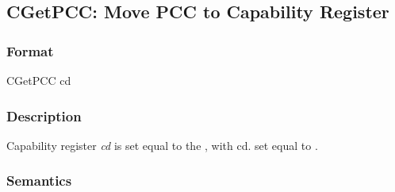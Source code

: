 \clearpage
{}
{}
\subsection*{CGetPCC: Move PCC to Capability Register}

\subsubsection*{Format}

CGetPCC cd


\begin{center}
\end{center}

\subsubsection*{Description}

Capability register \textit{cd} is set equal to the \PCC{}, with
cd.\coffset{} set equal to \PC{}.

\subsubsection*{Semantics}



